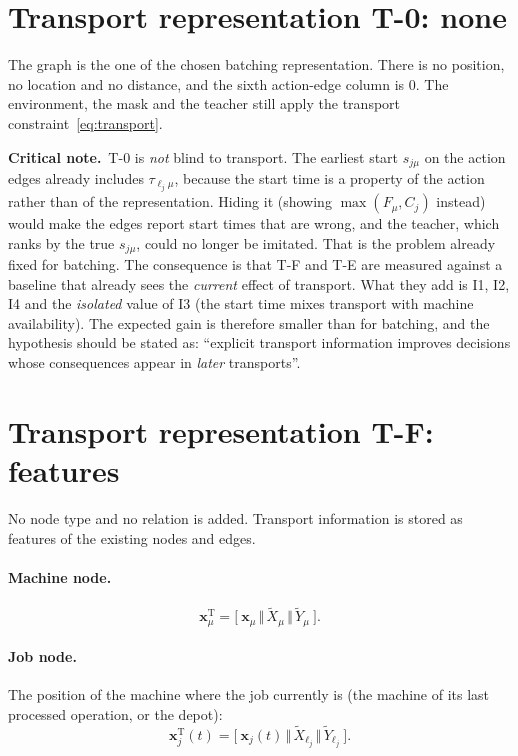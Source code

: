\documentclass[11pt,a4paper]{article}
\newcommand{\cat}{\,\Vert\,}
\newcommand{\loc}{\ell}
\newcommand{\crit}[1]{\par\smallskip\noindent\textbf{Critical note.}\ #1\par\smallskip}
\begin{document}
\section{Transport representation T-0: none}
\label{sec:repT0}

The graph is the one of the chosen batching representation. There is no position,
no location and no distance, and the sixth action-edge column is $0$. The
environment, the mask and the teacher still apply the transport
constraint~\eqref{eq:transport}.

\crit{T-0 is \emph{not} blind to transport. The earliest start $s_{j\mu}$ on
the action edges already includes $\tau_{\loc_j\mu}$, because the start time is
a property of the action rather than of the representation. Hiding it (showing
$\max(F_\mu,C_j)$ instead) would make the edges report start times that are
wrong, and the teacher, which ranks by the true $s_{j\mu}$, could no longer be
imitated. That is the problem already fixed for batching. The consequence is
that T-F and T-E are measured against a baseline that already sees the
\emph{current} effect of transport. What they add is I1, I2, I4 and the
\emph{isolated} value of I3 (the start time mixes transport with machine
availability). The expected gain is therefore smaller than for batching, and
the hypothesis should be stated as: ``explicit transport information improves
decisions whose consequences appear in \emph{later} transports''.}

\section{Transport representation T-F: features}
\label{sec:repTF}

No node type and no relation is added. Transport information is stored as
features of the existing nodes and edges.

\paragraph{Machine node.}
\begin{equation}
  \mathbf{x}^{\mathrm{T}}_\mu=\bigl[\ \mathbf{x}_\mu \cat \tilde X_\mu \cat \tilde Y_\mu\ \bigr].
\end{equation}

\paragraph{Job node.} The position of the machine where the job currently is
(the machine of its last processed operation, or the depot):
\begin{equation}
  \mathbf{x}^{\mathrm{T}}_j(t)=\bigl[\ \mathbf{x}_j(t) \cat \tilde X_{\loc_j} \cat \tilde Y_{\loc_j}\ \bigr].
\end{equation}
\end{document}
